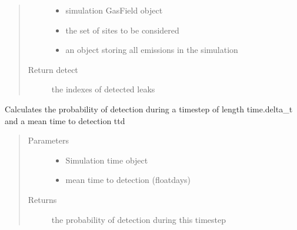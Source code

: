 \documentclass[letterpaper,10pt,english]{sphinxmanual}
\begin{document}
\begin{fulllineitems}
\begin{fulllineitems}
\begin{quote}
\begin{description}
\begin{itemize}
\item {} 
 \textendash{} simulation GasField object

\item {} 
 \textendash{} the set of sites to be considered

\item {} 
 \textendash{} an object storing all emissions in the simulation

\end{itemize}

\item[{Return detect}] \leavevmode
the indexes of detected leaks

\end{description}\end{quote}

\end{fulllineitems}


\begin{fulllineitems}
\label{\detokenize{index:feast.DetectionModules.site_monitor.SiteMonitor.prob_detection}}
Calculates the probability of detection during a timestep of length time.delta\_t and a mean time to detection
ttd
\begin{quote}\begin{description}
\item[{Parameters}] \leavevmode\begin{itemize}
\item {} 
 \textendash{} Simulation time object

\item {} 
 \textendash{} mean time to detection (float\textendash{}days)

\end{itemize}

\item[{Returns}] \leavevmode
the probability of detection during this timestep

\end{description}\end{quote}

\end{fulllineitems}


\end{fulllineitems}
\end{document}
